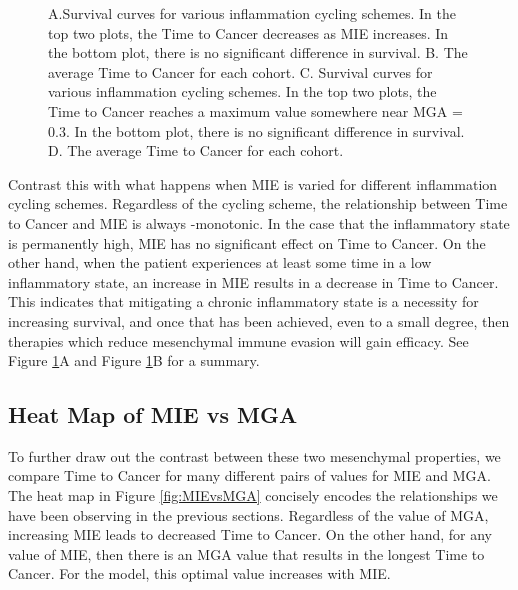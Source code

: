 \documentclass{article}
\begin{document}
\begin{figure}[H]
\center
{}
\caption{A.Survival curves for various inflammation cycling schemes. In the top two plots, the Time to Cancer decreases as MIE increases. In the bottom plot, there is no significant difference in survival.
B. The average Time to Cancer for each cohort.
C. Survival curves for various inflammation cycling schemes. In the top two plots, the Time to Cancer reaches a maximum value somewhere near MGA = 0.3. In the bottom plot, there is no significant difference in survival.
D. The average Time to Cancer for each cohort.}
\label{fig:VaryINFL_and_MesPars}
\end{figure}

Contrast this with what happens when MIE is varied for different inflammation cycling schemes.
Regardless of the cycling scheme, the relationship between Time to Cancer and MIE is always -monotonic.
In the case that the inflammatory state is permanently high, MIE has no significant effect on Time to Cancer.
On the other hand, when the patient experiences at least some time in a low inflammatory state, an increase in MIE results in a decrease in Time to Cancer.
This indicates that mitigating a chronic inflammatory state is a necessity for increasing survival, and once that has been achieved, even to a small degree, then therapies which reduce mesenchymal immune evasion will gain efficacy.
See Figure \ref{fig:VaryINFL_and_MesPars}A and Figure \ref{fig:VaryINFL_and_MesPars}B for a summary.

\subsection{Heat Map of MIE vs MGA}
To further draw out the contrast between these two mesenchymal properties, we compare Time to Cancer for many different pairs of values for MIE and MGA.
The heat map in Figure \ref{fig:MIEvsMGA} concisely encodes the relationships we have been observing in the previous sections.
Regardless of the value of MGA, increasing MIE leads to decreased Time to Cancer.
On the other hand, for any value of MIE, then there is an MGA value that results in the longest Time to Cancer.
For the model, this optimal value increases with MIE.
\end{document}
